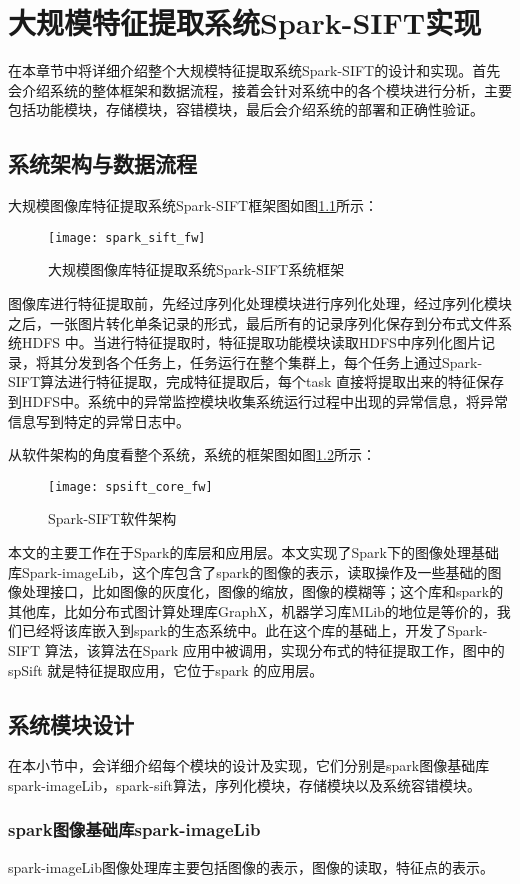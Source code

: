 ﻿\chapter{大规模特征提取系统Spark-SIFT实现}
在本章节中将详细介绍整个大规模特征提取系统Spark-SIFT的设计和实现。首先会介绍系统的整体框架和数据流程，接着会针对系统中的各个模块进行分析，主要包括功能模块，存储模块，容错模块，最后会介绍系统的部署和正确性验证。

\section{系统架构与数据流程}
大规模图像库特征提取系统Spark-SIFT框架图如图\ref{fig:spark_sift_fw}所示：
\begin{figure}[htp]
\centering
\texttt{[image: spark\_sift\_fw]}
\caption{大规模图像库特征提取系统Spark-SIFT系统框架}
\label{fig:spark_sift_fw}
\end{figure}
图像库进行特征提取前，先经过序列化处理模块进行序列化处理，经过序列化模块之后，一张图片转化单条记录的形式，最后所有的记录序列化保存到分布式文件系统HDFS 中。当进行特征提取时，特征提取功能模块读取HDFS中序列化图片记录，将其分发到各个任务上，任务运行在整个集群上，每个任务上通过Spark-SIFT算法进行特征提取，完成特征提取后，每个task 直接将提取出来的特征保存到HDFS中。系统中的异常监控模块收集系统运行过程中出现的异常信息，将异常信息写到特定的异常日志中。

从软件架构的角度看整个系统，系统的框架图如图\ref{fig:spsift_core_fw}所示：
\begin{figure}[htp]
\centering
\texttt{[image: spsift\_core\_fw]}
\caption{Spark-SIFT软件架构}
\label{fig:spsift_core_fw}
\end{figure}
本文的主要工作在于Spark的库层和应用层。本文实现了Spark下的图像处理基础库Spark-imageLib，这个库包含了spark的图像的表示，读取操作及一些基础的图像处理接口，比如图像的灰度化，图像的缩放，图像的模糊等；这个库和spark的其他库，比如分布式图计算处理库GraphX，机器学习库MLib的地位是等价的，我们已经将该库嵌入到spark的生态系统中。此在这个库的基础上，开发了Spark-SIFT 算法，该算法在Spark 应用中被调用，实现分布式的特征提取工作，图中的spSift 就是特征提取应用，它位于spark 的应用层。
\section{系统模块设计}
在本小节中，会详细介绍每个模块的设计及实现，它们分别是spark图像基础库spark-imageLib，spark-sift算法，序列化模块，存储模块以及系统容错模块。
\subsection{spark图像基础库spark-imageLib}
spark-imageLib图像处理库主要包括图像的表示，图像的读取，特征点的表示。
